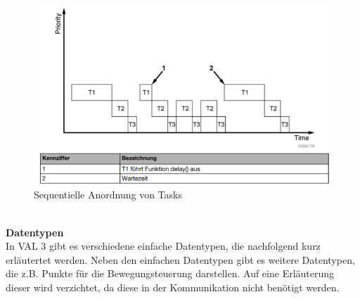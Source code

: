 \documentclass[ a4paper,
                oneside,
                toc=bibliography,
                toc=listof
                ]{scrbook}
\begin{document}
   	\begin{figure}[!ht]
   		\centering
   		\includegraphics[width=0.80\linewidth]{./images/tasks.png}
   		\caption{Sequentielle Anordnung von Tasks \cite{VAL3}} 
   		\label{fig:tasks}
   	\end{figure} \vspace{0.5\baselineskip}\\
   	\textbf{Datentypen}\\
   	In VAL 3 gibt es verschiedene einfache Datentypen, die nachfolgend kurz erläutertet werden. Neben den einfachen Datentypen gibt es weitere Datentypen, die z.B. Punkte für die Bewegungsteuerung darstellen. Auf eine Erläuterung dieser wird verzichtet, da diese in der Kommunikation nicht benötigt werden. \clearpage
\end{document}
